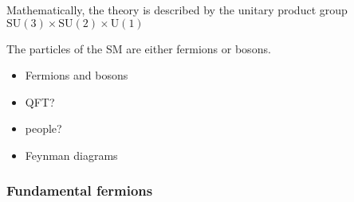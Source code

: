 Mathematically, the theory is described by the unitary product group $\text{SU}(3)\times\text{SU}(2)\times\text{U}(1)$ 

The particles of the SM are either fermions or bosons.



{\color{Red}
\begin{itemize}
\item Fermions and bosons
\item QFT?
\item people?
\item Feynman diagrams
\end{itemize}}

\subsubsection{Fundamental fermions}

